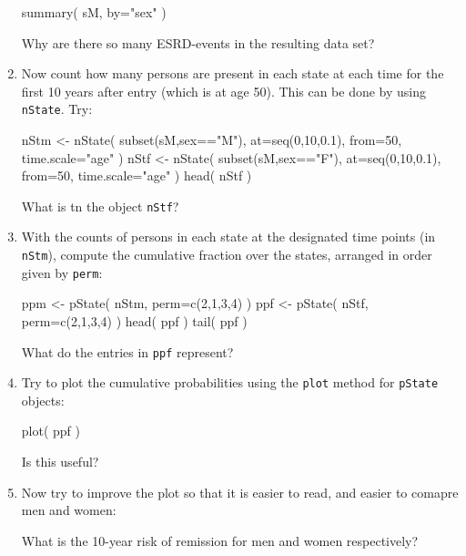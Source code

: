 \begin{enumerate}[resume]
\begin{Schunk}
\begin{Sinput}
 summary( sM, by="sex" )
\end{Sinput}
\end{Schunk}
Why are there so many ESRD-events in the resulting data set?
\item Now count how many persons are present in each state
  at each time for the first 10 years after entry (which is at age 50). This
  can be done by using \texttt{nState}. Try:
\begin{Schunk}
\begin{Sinput}
 nStm <- nState( subset(sM,sex=="M"), at=seq(0,10,0.1), from=50, time.scale="age" )
 nStf <- nState( subset(sM,sex=="F"), at=seq(0,10,0.1), from=50, time.scale="age" )
 head( nStf )
\end{Sinput}
\end{Schunk}
What is tn the object \texttt{nStf}?
\item With the counts of persons in each state at the
  designated time points (in \texttt{nStm}), compute the cumulative fraction over the
  states, arranged in order given by \texttt{perm}:
\begin{Schunk}
\begin{Sinput}
 ppm <- pState( nStm, perm=c(2,1,3,4) )
 ppf <- pState( nStf, perm=c(2,1,3,4) )
 head( ppf )
 tail( ppf )
\end{Sinput}
\end{Schunk}
What do the entries in \texttt{ppf} represent?
\item Try to plot the cumulative probabilities using the \texttt{plot}
  method for \texttt{pState} objects:
\begin{Schunk}
\begin{Sinput}
 plot( ppf )
\end{Sinput}
\end{Schunk}
Is this useful?
\item Now try to improve the plot so that it is easier to read, and
  easier to comapre men and women:
\begin{Schunk}
\end{Schunk}
What is the 10-year risk of remission for men and women respectively?
\end{enumerate}
